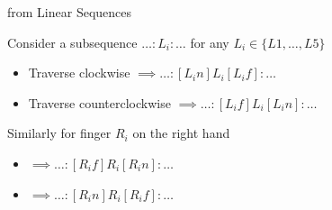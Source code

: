 \begin{frame}{\subsecname from Linear Sequences}
\begin{adjustwidth}{-1.5em}{-1.5em}
Consider a subsequence $\ldots:L_i:\ldots$ for any $L_i\in\{L1,\ldots,L5\}$

\begin{itemize}[<+(1)->]
    \item Traverse clockwise  \pause $\implies \ldots:[L_in] L_i [L_if]:\ldots$
    \item Traverse counterclockwise  \pause $\implies\ldots: [L_if] L_i [L_in]:\ldots$
\end{itemize}

\pause Similarly for finger $R_i$ on the right hand

\begin{itemize}
    \item {} $\implies \ldots:[R_if]R_i[R_in]:\ldots$
    \item{} $\implies\ldots:[R_in]R_i[R_if]:\ldots$
\end{itemize}
\end{adjustwidth}
\end{frame}

